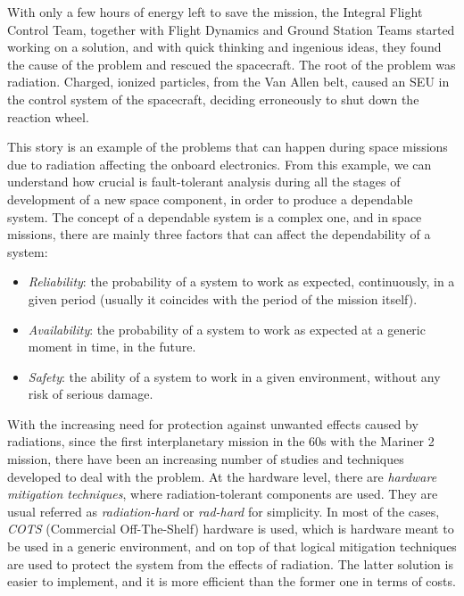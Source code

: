 With only a few hours of energy left to save the mission, the Integral Flight Control Team, together with Flight Dynamics and Ground Station Teams started working on a solution, and with quick thinking and ingenious ideas, they found the cause of the problem and rescued the spacecraft. The root of the problem was radiation. Charged, ionized particles, from the Van Allen belt, caused an SEU in the control system of the spacecraft, deciding erroneously to shut down the reaction wheel. \bigskip

This story is an example of the problems that can happen during space missions due to radiation affecting the onboard electronics. From this example, we can understand how crucial is fault-tolerant analysis during all the stages of development of a new space component, in order to produce a dependable system. The concept of a dependable system is a complex one, and in space missions, there are mainly three factors that can affect the dependability of a system:

\begin{itemize}
    \item \textit{Reliability}: the probability of a system to work as expected, continuously, in a given period (usually it coincides with the period of the mission itself).
    \item \textit{Availability}: the probability of a system to work as expected at a generic moment in time, in the future.
    \item \textit{Safety}: the ability of a system to work in a given environment, without any risk of serious damage.
\end{itemize}

With the increasing need for protection against unwanted effects caused by radiations, since the first interplanetary mission in the 60s with the Mariner 2 mission, there have been an increasing number of studies and techniques developed to deal with the problem. At the hardware level, there are \textit{hardware mitigation techniques}, where radiation-tolerant components are used. They are usual referred as \textit{radiation-hard} or \textit{rad-hard} for simplicity. In most of the cases, \textit{COTS} (Commercial Off-The-Shelf) hardware \cite{1589186} is used, which is hardware meant to be used in a generic environment, and on top of that logical mitigation techniques \cite{1546456} are used to protect the system from the effects of radiation. The latter solution is easier to implement, and it is more efficient than the former one in terms of costs. 

